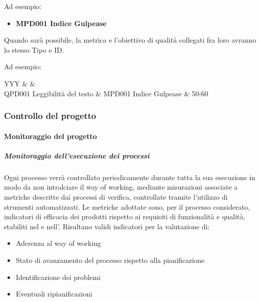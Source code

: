 			Ad esempio:

			\begin{itemize}
				\item \textbf{MPD001 Indice Gulpease}
			\end{itemize}

			Quando sarà possibile, la metrica e l'obiettivo di qualità collegati fra loro avranno lo stesso Tipo e ID.

			Ad esempio:

			\begin{table}[H]
				\begin{detailtable}{\textwidth}{YYY}
					 &
					 &
					\\
					\hline
					QPD001 Leggibilità del testo & MPD001 Indice Gulpease & 50-60\\
					\hline
				\end{detailtable}
			\end{table}
			
		\subsubsection{Controllo del progetto}

			\paragraph{Monitoraggio del progetto}

			\subparagraph{Monitoraggio dell'esecuzione dei processi}
			Ogni processo verrà controllato periodicamente durante tutta la sua esecuzione in modo da non intralciare il way of working,
			mediante misurazioni associate a metriche descritte dai processi di verifica, controllate tramite l'utilizzo di strumenti automatizzati.
			Le metriche adottate sono, per il processo considerato, indicatori di efficacia dei prodotti rispetto ai requisiti di funzionalità e qualità,
			stabiliti nel \Doc{\PdQv} e nell'\Doc{\AdRv}. Risultano validi indicatori per la valutazione di:
			\begin{itemize}
				\item Aderenza al way of working
				\item Stato di avanzamento del processo rispetto alla pianificazione
				\item Identificazione dei problemi
				\item Eventuali ripianificazioni
			\end{itemize}


